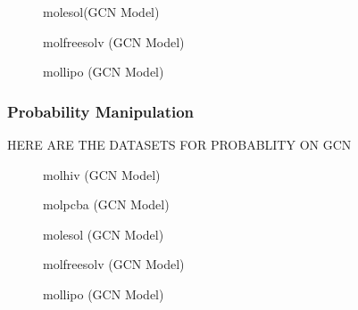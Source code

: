 \begin{figure}
    \centering
    \caption{molesol(GCN Model)}
    \label{fig:gcn-molfreesolv}
\end{figure}

\begin{figure}
    \centering
    \caption{molfreesolv (GCN Model)}
    \label{fig:gcn-molfreesolv}
\end{figure}

\begin{figure}
    \centering
    \caption{mollipo (GCN Model)}
    \label{fig:gcn-molfreesolv}
\end{figure}

\subsubsection{Probability Manipulation}

HERE ARE THE DATASETS FOR PROBABLITY ON GCN

\begin{figure}
    \centering
    \caption{molhiv (GCN Model)}
    \label{fig:gcn-molfreesolv}
\end{figure}

\begin{figure}
    \centering
    \caption{molpcba (GCN Model)}
    \label{fig:gcn-molfreesolv}
\end{figure}

\begin{figure}
    \centering
    \caption{molesol (GCN Model)}
    \label{fig:gcn-molfreesolv}
\end{figure}

\begin{figure}
    \centering
    \caption{molfreesolv (GCN Model)}
    \label{fig:gcn-molfreesolv}
\end{figure}

\begin{figure}
    \centering
    \caption{mollipo (GCN Model)}
    \label{fig:gcn-molfreesolv}
\end{figure}







